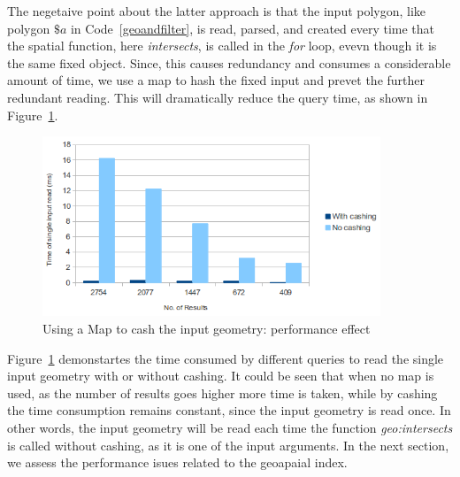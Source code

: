 \documentclass[a4paper,12pt]{article}
\begin{document}
The negetaive point about the latter approach is that the input polygon, like polygon $\$a$ in Code~\ref{geoandfilter}, is read, parsed, and created every time that the spatial function, here \textit{intersects}, is called in the \textit{for} loop, evevn though it is the same fixed object. Since, this causes redundancy and consumes a considerable amount of time, we use a map to hash the fixed input and prevet the further redundant reading. This will dramatically reduce the query time, as shown in Figure~\ref{figMap}.
 \begin{figure}
\centering
\includegraphics[width=0.9\textwidth]{MapIndexing}
\caption{Using a Map to cash the input geometry: performance effect}
\label{figMap}
\end{figure}

Figure~\ref{figMap} demonstartes the time consumed by different queries to read the single input geometry with or without cashing. It could be seen that when no map is used, as the number of results goes higher more time is taken, while by cashing the time consumption remains constant, since the input geometry is read once. In other words, the input geometry will be read each time the function \textit{geo:intersects} is called without cashing, as it is one of the input arguments. In the next section, we assess the performance isues related to the geoapaial index.
\end{document}
